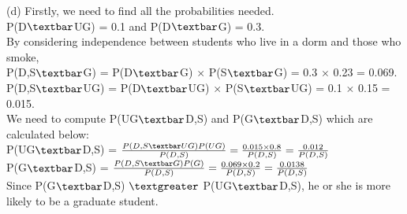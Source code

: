 \documentclass[10pt]{article}
\begin{document}
\begin{flushleft}
(d) Firstly, we need to find all the probabilities needed.\\
P(D$\textbar$UG) = 0.1 and P(D$\textbar$G) = 0.3.\\
By considering independence between students who live in a dorm and those who smoke,\\
P(D,S$\textbar$G) = P(D$\textbar$G) $\times$ P(S$\textbar$G) = 0.3 $\times$ 0.23 = 0.069.\\
P(D,S$\textbar$UG) = P(D$\textbar$UG) $\times$ P(S$\textbar$UG) = 0.1 $\times$ 0.15 = 0.015.\\
\vspace{0.5em}
We need to compute P(UG$\textbar$D,S) and P(G$\textbar$D,S) which are calculated below:\\
\vspace{0.5em} 
\hspace{2em} P(UG$\textbar$D,S) = $\frac{P(D,S\textbar UG) P(UG)}{P(D,S)} = \frac{0.015 \times 0.8}{P(D,S)} = \frac{0.012}{P(D,S)}$\\
\vspace{0.5em}
\hspace{2em} P(G$\textbar$D,S) = $\frac{P(D,S\textbar G) P(G)}{P(D,S)} = \frac{0.069 \times 0.2}{P(D,S)} = \frac{0.0138}{P(D,S)}$\\
\vspace{0.5em}
Since P(G$\textbar$D,S) $\textgreater$ P(UG$\textbar$D,S), he or she is more likely to be a graduate student.\\
\end{flushleft}
\end{document}
